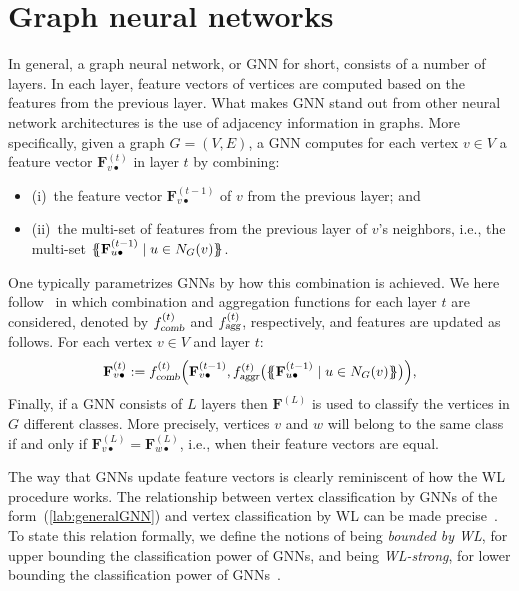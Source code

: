 

\section{Graph neural networks}
In general, a graph neural network, or GNN for short, consists of a number of layers. In each layer, feature vectors of vertices are computed based on the features from the previous layer.
What makes GNN stand out from other neural network architectures is the use of adjacency information in graphs. More specifically, given a graph $G=(V,E)$, a GNN computes for each vertex $v\in V$ a feature vector $\mathbf{F}^{(t)}_{v\bullet}$  in layer $t$ by combining:
\begin{itemize}
	\item[] (i)~the feature vector $\mathbf{F}^{(t-1)}_{v\bullet}$ of $v$ from the previous layer; and
	\item[] (ii)~the multi-set of features from the previous layer  of $v$'s neighbors, i.e., the multi-set $\{\!\!\{ \mathbf{F}^{(t-1)}_{u\bullet} \mathrel{\mid} u \in N_G(v) \}\!\!\}$.
\end{itemize}
One typically parametrizes GNNs by how this combination is achieved. We here follow~\cite{grohewl,DBLP:conf/iclr/XuHLJ19}  in which combination and aggregation functions for each layer $t$ are considered, denoted by
$f_{\textsl{comb}}^{(t)}$ and
$f_{\textsl{agg}}^{(t)}$, respectively, and features are updated as follows.  For each vertex $v\in V$ and layer $t$:
\begin{equation}
\mathbf{F}^{(t)}_{v\bullet}:=
f_{\textsl{comb}}^{(t)}\Bigl(
\mathbf{F}_{v\bullet}^{(t-1)},f_{\textsl{aggr}}^{(t)}\bigl(\{\!\!\{ \mathbf{F}^{(t-1)}_{u\bullet} \mathrel{\mid} u \in N_G(v) \}\!\!\}\bigr)
\Bigr), \label{lab:generalGNN}
\end{equation}
 Finally, if a GNN consists of $L$ layers then
$\mathbf{F}^{(L)}$ is used to classify the vertices in $G$ different classes. More precisely, vertices $v$ and $w$ will belong to the same class if and only if 
$\mathbf{F}^{(L)}_{v\bullet}=\mathbf{F}^{(L)}_{w\bullet}$, i.e., when their feature vectors are equal.

The way that GNNs update feature vectors is clearly reminiscent of how the WL procedure works. The relationship between vertex classification by GNNs of the form~(\ref{lab:generalGNN}) and vertex classification by WL can be made precise~\cite{grohewl,DBLP:conf/iclr/XuHLJ19}. To state this relation formally, we define the notions of being \textit{bounded by WL}, for upper bounding the classification power of GNNs, and being \textit{WL-strong}, for lower bounding the classification power of GNNs~\cite{grohewl}. 

